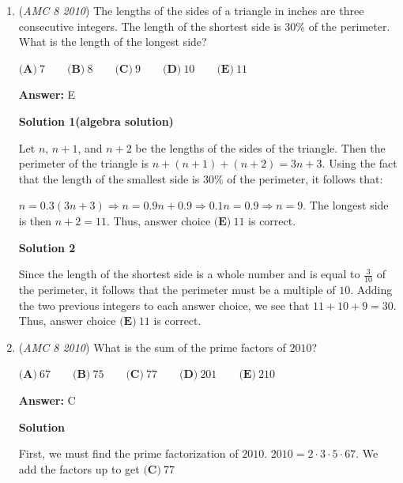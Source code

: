 \begin{enumerate}
 


 


 


 


	\item (\textit{AMC 8 2010}) The lengths of the sides of a triangle in inches are three consecutive integers. The length of the shortest side is $30\%$ of the perimeter. What is the length of the longest side?


 $\textbf{(A)}\ 7 \qquad\textbf{(B)}\ 8\qquad\textbf{(C)}\ 9\qquad\textbf{(D)}\ 10\qquad\textbf{(E)}\ 11$

 \textbf{Answer: }E



\textbf{Solution 1(algebra solution)}

Let $n$, $n+1$, and $n+2$ be the lengths of the sides of the triangle. Then the perimeter of the triangle is $n + (n+1) + (n+2) = 3n+3$. Using the fact that the length of the smallest side is $30\%$ of the perimeter, it follows that:

 $n = 0.3(3n+3) \Rightarrow n = 0.9n+0.9 \Rightarrow 0.1n = 0.9 \Rightarrow n=9$. The longest side is then $n+2 = 11$. Thus, answer choice $\boxed{\textbf{(E)}\ 11}$ is correct.

 



\textbf{Solution 2}

Since the length of the shortest side is a whole number and is equal to $\frac{3}{10}$ of the perimeter, it follows that the perimeter must be a multiple of $10$. Adding the two previous integers to each answer choice, we see that $11+10+9=30$. Thus, answer choice $\boxed{\textbf{(E)}\ 11}$ is correct.

 


 


 


 


	\item (\textit{AMC 8 2010}) What is the sum of the prime factors of $2010$? 


 $\textbf{(A)}\ 67 \qquad\textbf{(B)}\ 75\qquad\textbf{(C)}\ 77\qquad\textbf{(D)}\ 201\qquad\textbf{(E)}\ 210$

 \textbf{Answer: }C



\textbf{Solution}

First, we must find the prime factorization of $2010$. $2010=2\cdot 3 \cdot 5 \cdot 67$. We add the factors up to get $\boxed{\textbf{(C)}\ 77}$




\end{enumerate}

